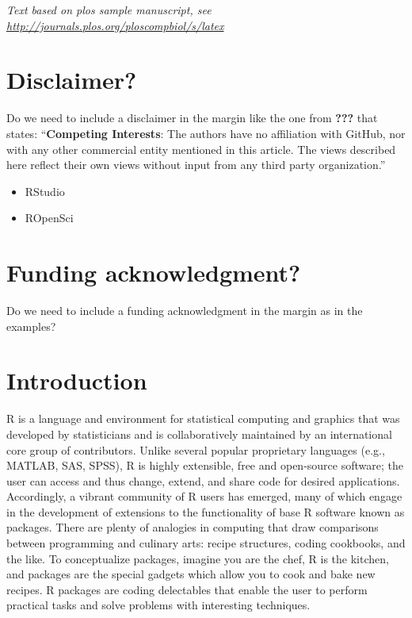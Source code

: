 \documentclass[10pt,letterpaper]{article}
\providecommand{\tightlist}{%
  \setlength{\itemsep}{0pt}\setlength{\parskip}{0pt}}
\begin{document}
\linenumbers

\emph{Text based on plos sample manuscript, see
\url{http://journals.plos.org/ploscompbiol/s/latex}}

\hypertarget{disclaimer}{%
\section{Disclaimer?}\label{disclaimer}}

Do we need to include a disclaimer in the margin like the one from
\textbf{???} that states: ``\textbf{Competing Interests}: The authors
have no affiliation with GitHub, nor with any other commercial entity
mentioned in this article. The views described here reflect their own
views without input from any third party organization.''

\begin{itemize}
\tightlist
\item
  RStudio
\item
  ROpenSci
\end{itemize}

\hypertarget{funding-acknowledgment}{%
\section{Funding acknowledgment?}\label{funding-acknowledgment}}

Do we need to include a funding acknowledgment in the margin as in the
examples?

\hypertarget{introduction}{%
\section{Introduction}\label{introduction}}

R is a language and environment for statistical computing and graphics
that was developed by statisticians and is collaboratively maintained by
an international core group of contributors. Unlike several popular
proprietary languages (e.g., MATLAB, SAS, SPSS), R is highly extensible,
free and open-source software; the user can access and thus change,
extend, and share code for desired applications. Accordingly, a vibrant
community of R users has emerged, many of which engage in the
development of extensions to the functionality of base R software known
as packages. There are plenty of analogies in computing that draw
comparisons between programming and culinary arts: recipe structures,
coding cookbooks, and the like. To conceptualize packages, imagine you
are the chef, R is the kitchen, and packages are the special gadgets
which allow you to cook and bake new recipes. R packages are coding
delectables that enable the user to perform practical tasks and solve
problems with interesting techniques.
\end{document}
